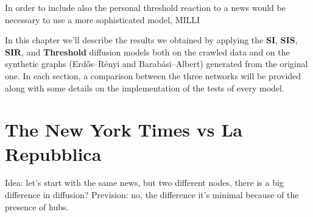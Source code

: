 In order to include also the personal threshold reaction to a news would be necessary to use a more sophisticated model, MILLI

In this chapter we'll describe the results we obtained by applying the \textbf{SI}, \textbf{SIS}, \textbf{SIR},
and \textbf{Threshold} diffusion models both on the crawled data and on the synthetic graphs (Erdős–Rényi and
Barabási–Albert) generated from the original one. In each section, a comparison between the three networks will be
provided along with some details on the implementation of the tests of every model.


\section{The New York Times vs La Repubblica }

Idea: let's start with the same news, but two different nodes, there is a big difference in diffusion?
Prevision: no, the difference it's minimal because of the presence of hubs.








